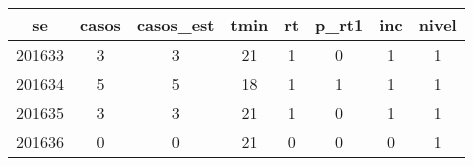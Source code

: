 \begin{tabular}{c|ccccccc}
  \hline
se & casos & casos\_est & tmin & rt & p\_rt1 & inc & nivel \\ 
  \hline
201633 & 3 & 3 & 21 & 1 & 0 & 1 & 1 \\ 
  201634 & 5 & 5 & 18 & 1 & 1 & 1 & 1 \\ 
  201635 & 3 & 3 & 21 & 1 & 0 & 1 & 1 \\ 
  201636 & 0 & 0 & 21 & 0 & 0 & 0 & 1 \\ 
   \hline
\end{tabular}
